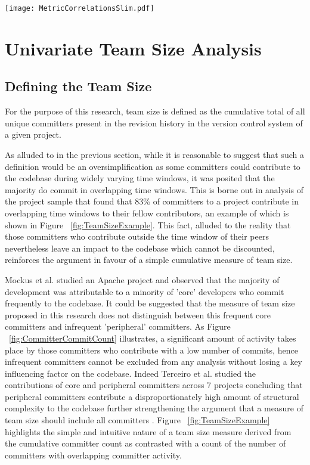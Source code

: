 \begin{table}
\centering 
{}
\begin{tabular}
 \centering 
 \texttt{[image: MetricCorrelationsSlim.pdf]}
 \label{tab:MetricCorrelations}
\end{tabular}
\end{table}


\section{Univariate Team Size Analysis} %
\subsection{Defining the Team Size}
For the purpose of this research, team size is defined as the cumulative total of all unique committers present in the revision history in the version control system of a given project. 

As alluded to in the previous section, while it is reasonable to suggest that such a definition would be an oversimplification as some committers could contribute to the codebase during widely varying time windows, it was posited that the majority do commit in overlapping time windows. This is borne out in analysis of the project sample that found that 83\% of committers to a project contribute in overlapping time windows to their fellow contributors, an example of which is shown in Figure ~\ref{fig:TeamSizeExample}. This fact, alluded to the reality that those committers who contribute outside the time window of their peers nevertheless leave an impact to the codebase which cannot be discounted, reinforces the argument in favour of a simple cumulative measure of team size.

Mockus et al. studied an Apache project and observed that the majority of development was attributable to a minority of 'core' developers \citep{mockus2000case} who commit frequently to the codebase. It could be suggested that the measure of team size proposed in this research does not distinguish between this frequent core committers and infrequent 'peripheral' committers. As Figure ~\ref{fig:CommitterCommitCount} illustrates, a significant amount of activity takes place by those committers who contribute with a low number of commits, hence infrequent committers cannot be excluded from any analysis without losing a key influencing factor on the codebase. Indeed Terceiro et al. studied the contributions of core and peripheral committers across 7 projects concluding that peripheral committers contribute a disproportionately high amount of structural complexity to the codebase further strengthening the argument that a measure of team size should include all committers \citep{terceiro2010empirical}. Figure ~\ref{fig:TeamSizeExample} highlights the simple and intuitive nature of a team size measure derived from the cumulative committer count as contrasted with a count of the number of committers with overlapping committer activity.

